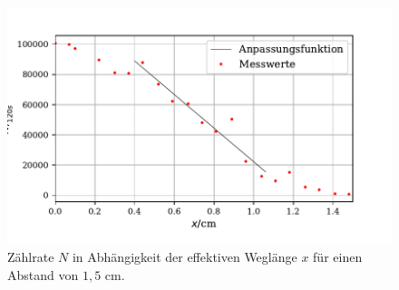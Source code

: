 \begin{figure}[H]
  \centering
  \includegraphics{plot2.pdf}
  \caption{Zählrate $N$ in Abhängigkeit der effektiven Weglänge $x$ für einen Abstand von $1,5$ $\si{\cm}$. }
  \label{fig:plot}
\end{figure}

